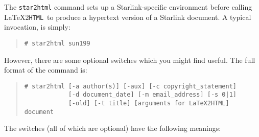 \documentclass[twoside,11pt]{article}
\newcommand{\latextohtml}{\LaTeX2\texttt{HTML}}
\renewcommand{\_}{\texttt{\symbol{95}}}
\begin{document}
The \texttt{star2html} command sets up a Starlink-specific environment before
calling \latextohtml\ to produce a hypertext version of a Starlink document.
A typical invocation, is simply:

\begin{quote}
\texttt{\# star2html sun199}
\end{quote}

However, there are some optional switches which you might find useful.
The full format of the command is:

\begin{quote}
\begin{verbatim}
# star2html [-a author(s)] [-aux] [-c copyright_statement] 
            [-d document_date] [-m email_address] [-s 0|1] 
            [-old] [-t title] [arguments for LaTeX2HTML] document
\end{verbatim}
\end{quote}

The switches (all of which are optional) have the following meanings:
\end{document}
